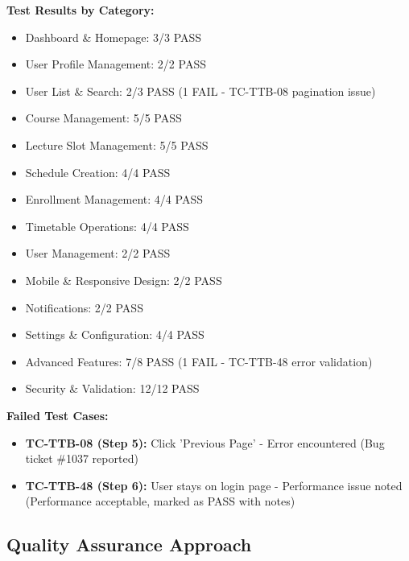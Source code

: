 \textbf{Test Results by Category:}
\begin{itemize}[leftmargin=*]
    \item Dashboard \& Homepage: 3/3 PASS
    \item User Profile Management: 2/2 PASS
    \item User List \& Search: 2/3 PASS (1 FAIL - TC-TTB-08 pagination issue)
    \item Course Management: 5/5 PASS
    \item Lecture Slot Management: 5/5 PASS
    \item Schedule Creation: 4/4 PASS
    \item Enrollment Management: 4/4 PASS
    \item Timetable Operations: 4/4 PASS
    \item User Management: 2/2 PASS
    \item Mobile \& Responsive Design: 2/2 PASS
    \item Notifications: 2/2 PASS
    \item Settings \& Configuration: 4/4 PASS
    \item Advanced Features: 7/8 PASS (1 FAIL - TC-TTB-48 error validation)
    \item Security \& Validation: 12/12 PASS
\end{itemize}

\textbf{Failed Test Cases:}
\begin{itemize}[leftmargin=*]
    \item \textbf{TC-TTB-08 (Step 5):} Click 'Previous Page' - Error encountered (Bug ticket \#1037 reported)
    \item \textbf{TC-TTB-48 (Step 6):} User stays on login page - Performance issue noted (Performance acceptable, marked as PASS with notes)
\end{itemize}

\subsection{Quality Assurance Approach}

